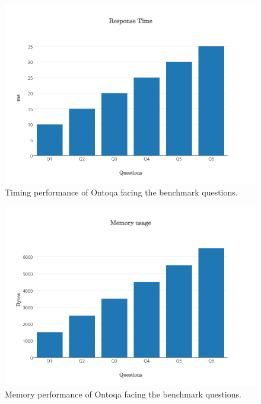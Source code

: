 \begin{figure}[tp]
	\centering
	\includegraphics[width=0.8\columnwidth]{./fig/evaluation-response-time}
	\caption{Timing performance of Ontoqa facing the benchmark questions.}
	\label{fig:evaluation-time}
\end{figure}

\begin{figure}[tp]
	\centering
	\includegraphics[width=0.8\columnwidth]{./fig/evaluation-memory-usage}
	\caption{Memory performance of Ontoqa facing the benchmark questions.}
	\label{fig:evaluation-memory}
\end{figure}